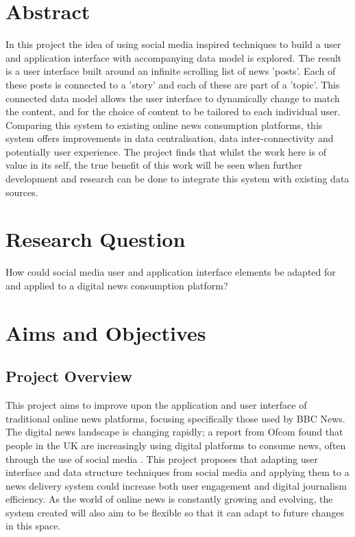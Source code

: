 \documentclass[12pt,titlepage]{article}
\begin{document}

\tableofcontents
\newpage

\section{Abstract}

  In this project the idea of using social media inspired techniques to build a
  user and application interface with accompanying data model is explored. The
  result is a user interface built around an infinite scrolling list of news
  'posts'. Each of these posts is connected to a 'story' and each of these are
  part of a 'topic'. This connected data model allows the user interface to
  dynamically change to match the content, and for the choice of content to be
  tailored to each individual user. Comparing this system to existing online
  news consumption platforms, this system offers improvements in data
  centralisation, data inter-connectivity and potentially user experience. The
  project finds that whilst the work here is of value in its self, the true
  benefit of this work will be seen when further development and research can be
  done to integrate this system with existing data sources.

\section{Research Question}

How could social media user and application interface elements be adapted for
and applied to a digital news consumption platform?

\section{Aims and Objectives}

  \subsection{Project Overview}

  This project aims to improve upon the application and user interface of
  traditional online news platforms, focusing specifically those used by BBC
  News. The digital news landscape is changing rapidly; a report from Ofcom
  found that people in the UK are increasingly using digital platforms to
  consume news, often through the use of social media \citep{ofcom}. This
  project proposes that adapting user interface and data structure techniques
  from social media and applying them to a news delivery system could increase
  both user engagement and digital journalism efficiency. As the world of online
  news is constantly growing and evolving, the system created will also aim to
  be flexible so that it can adapt to future changes in this space.
\end{document}
